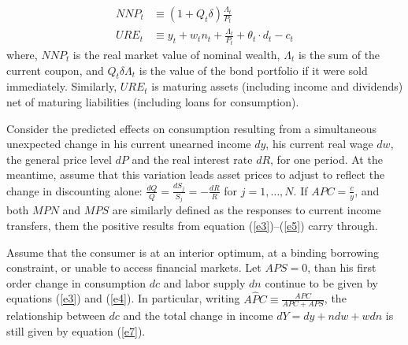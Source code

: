 \documentclass[11pt,letterpaper]{article}
\begin{document}
\begin{align*}
NNP_{t} &\equiv (1 + Q_{t}\delta) \frac{\Lambda_{t}}{P_{t}} \\
URE_{t} &\equiv y_{t} + w_{t}n_{t} + \frac{\Lambda_{t}}{P{_t}} + \theta_{t} \cdot d_{t} - c_{t}
\end{align*}
where, $NNP_{t}$ is the real market value of nominal wealth, $\Lambda_{t}$ is the sum of the current coupon, and $Q_{t}\delta\Lambda_{t}$ is the value of the bond portfolio if it were sold immediately. Similarly, $URE_{t}$ is maturing assets (including income and dividends) net of maturing liabilities (including loans for consumption). 

Consider the predicted effects on consumption resulting from a simultaneous unexpected change in his current unearned income $dy$, his current real wage $dw$, the general price level $dP$ and the real interest rate $dR$, for one period. At the meantime, assume that this variation leads asset prices to adjust to reflect the change in discounting alone: $\frac{dQ}{Q} = \frac{dS_{j}}{S_{j}} = - \frac{dR}{R}$ for $j = 1, \ldots, N$. If $APC = \frac{c}{y}$, and both $MPN$ and $MPS$ are similarly defined as the responses to current income transfers, them the positive results from equation (\ref{e3})--(\ref{e5}) carry through.   

Assume that the consumer is at an interior optimum, at a binding borrowing constraint, or unable to access financial markets. Let $APS = 0$, than his first order change in consumption $dc$ and labor supply $dn$ continue to be given by equations (\ref{e3}) and (\ref{e4}). In particular, writing $A\widehat{P}C \equiv \frac{APC}{APC + APS}$, the relationship between $dc$ and the total change in income $dY = dy + ndw + wdn$ is still given by equation (\ref{e7}). 
\end{document}
